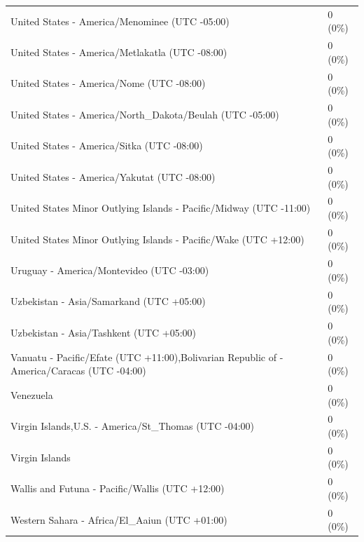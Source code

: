 \documentclass[
  english,
  man]{apa6}
\begin{document}
\begin{appendix}
\begin{table}
{\begin{tabular}[t]{ll}
\hspace{1em}United States - America/Menominee (UTC -05:00) & 0 (0\%)\\
\hspace{1em}United States - America/Metlakatla (UTC -08:00) & 0 (0\%)\\
\hspace{1em}United States - America/Nome (UTC -08:00) & 0 (0\%)\\
\hspace{1em}United States - America/North\_Dakota/Beulah (UTC -05:00) & 0 (0\%)\\
\addlinespace
\hspace{1em}United States - America/Sitka (UTC -08:00) & 0 (0\%)\\
\hspace{1em}United States - America/Yakutat (UTC -08:00) & 0 (0\%)\\
\hspace{1em}United States Minor Outlying Islands - Pacific/Midway (UTC -11:00) & 0 (0\%)\\
\hspace{1em}United States Minor Outlying Islands - Pacific/Wake (UTC +12:00) & 0 (0\%)\\
\hspace{1em}Uruguay - America/Montevideo (UTC -03:00) & 0 (0\%)\\
\addlinespace
\hspace{1em}Uzbekistan - Asia/Samarkand (UTC +05:00) & 0 (0\%)\\
\hspace{1em}Uzbekistan - Asia/Tashkent (UTC +05:00) & 0 (0\%)\\
\hspace{1em}Vanuatu - Pacific/Efate (UTC +11:00),Bolivarian Republic of - America/Caracas (UTC -04:00) & 0 (0\%)\\
\hspace{1em}Venezuela & 0 (0\%)\\
\hspace{1em}Virgin Islands,U.S. - America/St\_Thomas (UTC -04:00) & 0 (0\%)\\
\addlinespace
\hspace{1em}Virgin Islands & 0 (0\%)\\
\hspace{1em}Wallis and Futuna - Pacific/Wallis (UTC +12:00) & 0 (0\%)\\
\hspace{1em}Western Sahara - Africa/El\_Aaiun (UTC +01:00) & 0 (0\%)\\

\end{tabular}}
\end{table}
\end{appendix}
\end{document}
